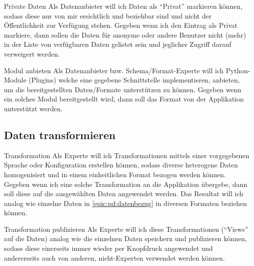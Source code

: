 \begin{scrumstory}[label=story:pd:private-daten]{Private Daten}
	Als Datenanbieter will ich Daten als ``Privat'' markieren können, sodass diese nur von mir ersichtlich und beziehbar sind und nicht der Öffentlichkeit zur Verfügung stehen.
	\storyacceptance	
	Gegeben
	wenn ich den Eintrag als Privat markiere, dann sollen die Daten für anonyme oder andere Benutzer nicht (mehr) in der Liste von verfügbaren Daten gelistet sein und jeglicher Zugriff darauf verweigert werden.
\end{scrumstory}

\begin{scrumstory}[label=story:pd:parser]{Modul anbieten}
	Als Datenanbieter bzw. Schema/Format-Experte will ich Python-Module (Plugins) welche eine gegebene Schnittstelle implementieren, anbieten, um die bereitgestellten Daten/Formate unterstützen zu können.
	\storyacceptance	
	Gegeben
	wenn ein solches Modul bereitgestellt wird, dann soll das Format von der Applikation unterstützt werden.
\end{scrumstory}


\subsection{Daten transformieren}

\begin{scrumepic}[label=epic:pd:transformation]{Transformation}
	Als Experte will ich Transformationen mittels einer vorgegebenen Sprache oder Konfiguration erstellen können, sodass diverse heterogene Daten homogenisiert und in einem einheitlichen Format bezogen werden können.
	\storyacceptance	
	Gegeben
	wenn ich eine solche Transformation an die Applikation übergebe, dann soll diese auf die ausgewählten Daten angewendet werden. Das Resultat will ich analog wie einzelne Daten in \cref{epic:pd:datenbezug} in diversen Formaten beziehen können.
\end{scrumepic}

\begin{scrumstory}[label=story:pd:views]{Transformation publizieren}
	Als Experte will ich diese Transformationen (``Views'' auf die Daten) analog wie die einzelnen Daten speichern und publizieren können, sodass diese einerseits immer wieder per Knopfdruck angewendet und andererseits auch von anderen, nicht-Experten verwendet werden können.
\end{scrumstory}



